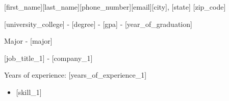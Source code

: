 \documentclass{columns}
\begin{document}
\begin{info}{[first\_name][last\_name]}{[phone\_number]}{[email]}{[city], [state] [zip\_code]}
\end{info}

	\begin{desc}{[university\_college] - [degree] - [gpa] - [year\_of\_graduation]}
	\item{Major - [major]} 
	\end{desc}
\sectionrule

\begin{multicols}{2}
	\begin{desc}{[job\_title\_1] - [company\_1]}
		\item{Years of experience: [years\_of\_experience\_1]}
	\end{desc}
	\columnbreak
		\begin{itemize}
		\item {[skill\_1]}
		\end{itemize}
\end{multicols}
\end{document}
